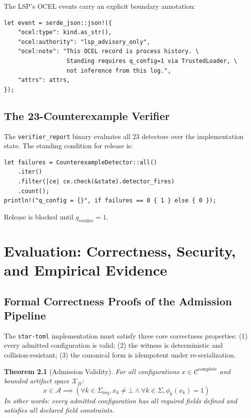 \documentclass[12pt, letterpaper]{report}
\theoremstyle{plain}
\newtheorem{theorem}{Theorem}[chapter]
\theoremstyle{definition}
\theoremstyle{remark}
\newcommand{\CC}{\mathcal{C}}
\begin{document}
The LSP's OCEL events carry an explicit boundary annotation:

\begin{lstlisting}[caption={OCEL boundary annotation in every LSP telemetry event.}]
let event = serde_json::json!({
    "ocel:type": kind.as_str(),
    "ocel:authority": "lsp_advisory_only",
    "ocel:note": "This OCEL record is process history. \
                  Standing requires q_config=1 via TrustedLoader, \
                  not inference from this log.",
    "attrs": attrs,
});
\end{lstlisting}

\section{The 23-Counterexample Verifier}

The \texttt{verifier\_report} binary evaluates all 23 detectors over
the implementation state. The standing condition for release is:

\begin{lstlisting}[caption={Verifier standing check.}]
let failures = CounterexampleDetector::all()
    .iter()
    .filter(|ce| ce.check(&state).detector_fires)
    .count();
println!("q_config = {}", if failures == 0 { 1 } else { 0 });
\end{lstlisting}

Release is blocked until $q_{\mathrm{verifier}} = 1$.

\chapter{Evaluation: Correctness, Security, and Empirical Evidence}
\label{ch:evaluation}

\section{Formal Correctness Proofs of the Admission Pipeline}

The \texttt{star-toml} implementation must satisfy three core correctness properties:
(1) every admitted configuration is valid;
(2) the witness is deterministic and collision-resistant;
(3) the canonical form is idempotent under re-serialization.

\begin{theorem}[Admission Validity]
\label{thm:admission-validity}
For all configurations $x \in \CC^{\mathrm{complete}}$ and bounded artifact space $\mathcal{X}_B$:
\[
  x \in \mathcal{A} \implies
  \left(
    \forall k \in \Sigma_{\mathrm{req}}, x_k \neq \bot
    \land \forall k \in \Sigma, \phi_k(x_k) = 1
  \right)
\]
In other words: every admitted configuration has all required fields defined
and satisfies all declared field constraints.
\end{theorem}
\end{document}
